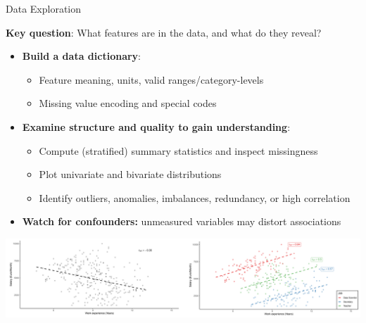 \documentclass[10pt,compress,t,notes=noshow, xcolor=table]{beamer}
\begin{document}
\begin{frame}{Data Exploration}
\label{data-exploration}

\textbf{Key question}: What features are in the data, and what do they reveal?

\begin{itemize}
  \item \textbf{Build a data dictionary}:
  \begin{itemize}
    \item Feature meaning, units, valid ranges/category-levels
    \item Missing value encoding and special codes
  \end{itemize}
  
  \item \textbf{Examine structure and quality to gain understanding}:
  \begin{itemize}
    \item Compute (stratified) summary statistics and inspect missingness
    \item Plot univariate and bivariate distributions
    \item Identify outliers, anomalies, imbalances, redundancy, or high correlation
  \end{itemize}
  
  \item \textbf{Watch for confounders:} unmeasured variables may distort associations
\end{itemize}

\begin{center}
\includegraphics[width=\linewidth]{figure_man/confounder.png}
\end{center}
\end{frame}
\end{document}
